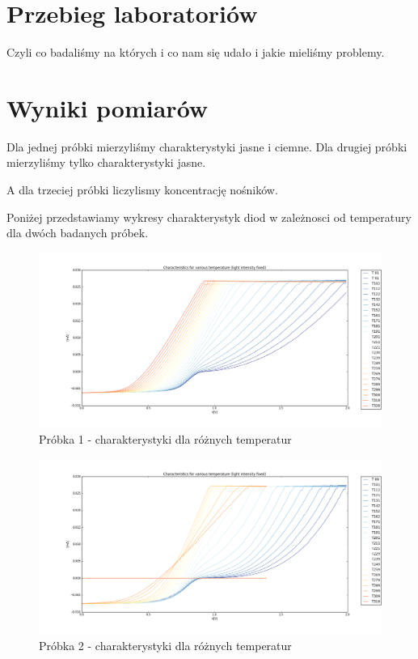 \documentclass[a4paper,12pt]{article}
\begin{document}
\section{Przebieg laboratoriów}
Czyli co badaliśmy na których i co nam się udało i jakie mieliśmy problemy.


\section{Wyniki pomiarów}

Dla jednej próbki mierzyliśmy charakterystyki jasne i ciemne.
Dla drugiej próbki mierzyliśmy tylko charakterystyki jasne.

A dla trzeciej próbki liczylismy koncentrację nośników.

Poniżej przedstawiamy wykresy charakterystyk diod w zależnosci od temperatury dla dwóch badanych próbek.

\begin{figure} [H]
  \begin{center}
    \includegraphics[width = 15cm]{probka1_temperatura.png}
    \caption{Próbka 1 - charakterystyki dla różnych temperatur}
  \end{center}
\end{figure}

\begin{figure} [H]
  \begin{center}
    \includegraphics[width = 15cm]{probka2_temperatura.png}
    \caption{Próbka 2 - charakterystyki dla różnych temperatur}
  \end{center}
\end{figure}
\end{document}
